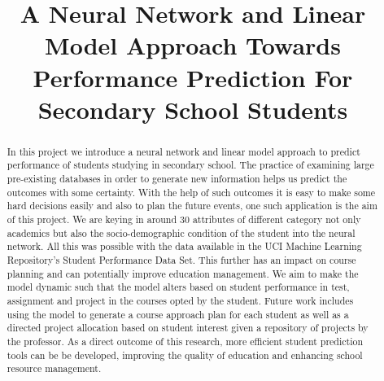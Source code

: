 \documentclass[conference]{IEEEtran}
\begin{document}
	\title{A Neural Network and Linear Model Approach Towards Performance Prediction For Secondary School Students}
    	\author{
		}

	\maketitle
	\begin{abstract}
In this project we introduce a neural network and linear model approach to predict performance of students studying in secondary school. The practice of examining large pre-existing databases in order to generate new information helps us predict the outcomes with some certainty. With the help of such outcomes it is easy to make some hard decisions easily and also to plan the future events, one such application is the aim of this project. We are keying in around 30 attributes of different category not only academics but also the socio-demographic condition of the student into the neural network. All this was possible with the data available in the UCI Machine Learning Repository's Student Performance Data Set. This further has an impact on course planning and can potentially improve education management. We aim to make the model dynamic such that the model alters based on student performance in test, assignment and project in the courses opted by the student. Future work includes using the model to generate a course approach plan for each student as well as a directed project allocation based on student interest given a repository of projects by the professor. As a direct outcome of this research, more efficient student prediction tools can be be developed, improving the quality of education and enhancing school resource management.

	\end{abstract}
\end{document}
